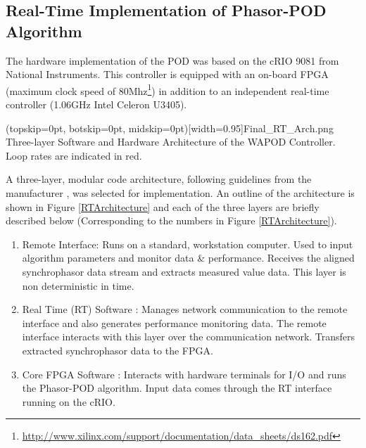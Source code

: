 \documentclass{ieeeaccess}
\begin{document}
\subsection{Real-Time Implementation of Phasor-POD Algorithm}
The hardware implementation of the POD was based on the cRIO 9081 \cite{cRIO9081} from National Instruments. This controller is equipped with an on-board FPGA (maximum clock speed of 80Mhz\footnote{\underline{http://www.xilinx.com/support/documentation/data\_sheets/ds162.pdf}}) in addition to an independent real-time controller (1.06GHz Intel Celeron U3405). 

\Figure[htpb](topskip=0pt, botskip=0pt, midskip=0pt)[width=0.95\textwidth]{Final_RT_Arch.png}
{Three-layer Software and Hardware Architecture of the WAPOD Controller. Loop rates are indicated in red.\label{RTArchitecture}}

A three-layer, modular code architecture\cite{Rebello_WAPOD_Software}, following guidelines from the manufacturer \cite{LabviewTemplate}, was selected for implementation. An outline of the architecture is shown in Figure \ref{RTArchitecture} and each of the three layers are briefly described below (Corresponding to the numbers in Figure \ref{RTArchitecture}). 

\begin{enumerate}
\item Remote Interface: Runs on a standard, workstation computer. Used to input algorithm parameters and monitor data \& performance. Receives the aligned synchrophasor data stream and extracts measured value data. This  layer is non deterministic in time.

\item Real Time (RT) Software : Manages network communication to the remote interface and also generates performance monitoring data. The remote interface interacts with this layer over the communication network. Transfers extracted synchrophasor data to the FPGA.

\item Core FPGA Software : Interacts with hardware terminals for I/O and runs the Phasor-POD algorithm. Input data comes through the RT interface running on the cRIO.

\end{enumerate}
\end{document}
